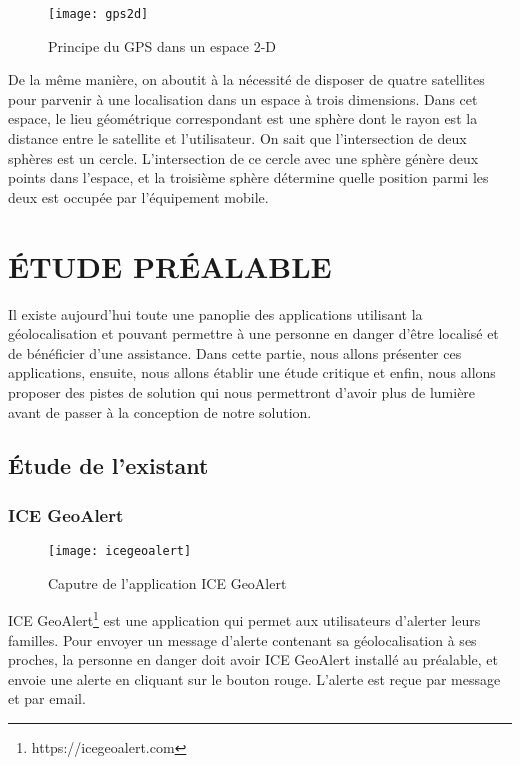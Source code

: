 \begin{figure}[H]
	\centering
	\texttt{[image: gps2d]}
	\caption{Principe du GPS dans un espace 2-D}
\end{figure}

De la même manière, on aboutit à la nécessité de disposer de quatre satellites pour parvenir à une localisation dans un espace à trois dimensions. Dans cet espace, le lieu géométrique correspondant est une sphère dont le rayon est la distance entre le satellite et l'utilisateur. On sait que l'intersection de deux sphères est un cercle. L'intersection de ce cercle avec une sphère génère deux points dans l'espace, et la troisième sphère détermine quelle position parmi les deux est occupée par l'équipement mobile.

\section{ÉTUDE PRÉALABLE}
Il existe aujourd’hui toute une panoplie des applications utilisant la géolocalisation et pouvant permettre à une personne en danger d’être localisé et de bénéficier d’une assistance. Dans cette partie, nous allons présenter ces applications, ensuite, nous allons établir une étude critique et enfin, nous allons proposer des pistes de solution qui nous permettront d’avoir plus de lumière avant de passer à la conception de notre solution.

\subsection{Étude de l’existant}
\subsubsection{ICE GeoAlert}
\begin{figure}[H]
	\centering
	\texttt{[image: icegeoalert]}
	\caption{Caputre de l’application ICE GeoAlert}
\end{figure}

ICE GeoAlert\footnote{https://icegeoalert.com} est une application qui permet aux utilisateurs d’alerter leurs familles. Pour envoyer un message d’alerte contenant sa géolocalisation à ses proches, la personne en danger doit avoir ICE GeoAlert installé au préalable, et envoie une alerte en cliquant sur le bouton rouge. L’alerte est reçue par message et par email.

